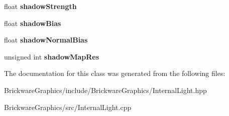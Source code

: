 \begin{DoxyCompactItemize}
\item 
\hypertarget{classBrickware_1_1Graphics_1_1InternalLight_addd14475c715fdb1abf0064f397696aa}{}float {\bfseries shadow\+Strength}\label{classBrickware_1_1Graphics_1_1InternalLight_addd14475c715fdb1abf0064f397696aa}

\item 
\hypertarget{classBrickware_1_1Graphics_1_1InternalLight_acc81d8cf19609cb8a9a7c06f3c479fb9}{}float {\bfseries shadow\+Bias}\label{classBrickware_1_1Graphics_1_1InternalLight_acc81d8cf19609cb8a9a7c06f3c479fb9}

\item 
\hypertarget{classBrickware_1_1Graphics_1_1InternalLight_a54bbe9da2702e2b3c6d233e54b13fbe8}{}float {\bfseries shadow\+Normal\+Bias}\label{classBrickware_1_1Graphics_1_1InternalLight_a54bbe9da2702e2b3c6d233e54b13fbe8}

\item 
\hypertarget{classBrickware_1_1Graphics_1_1InternalLight_af86a1d5e7b0a88b38cfa07d471d654d1}{}unsigned int {\bfseries shadow\+Map\+Res}\label{classBrickware_1_1Graphics_1_1InternalLight_af86a1d5e7b0a88b38cfa07d471d654d1}

\end{DoxyCompactItemize}


The documentation for this class was generated from the following files\+:\begin{DoxyCompactItemize}
\item 
Brickware\+Graphics/include/\+Brickware\+Graphics/Internal\+Light.\+hpp\item 
Brickware\+Graphics/src/Internal\+Light.\+cpp\end{DoxyCompactItemize}
